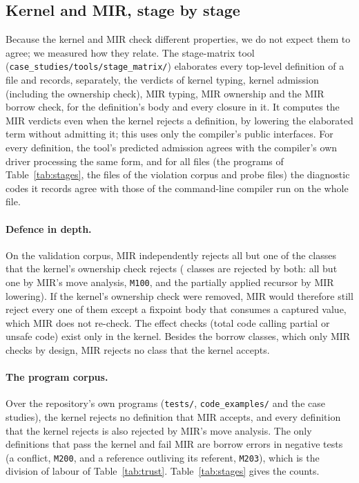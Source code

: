 \subsection{Kernel and MIR, stage by stage}\label{sec:eval:stages}

Because the kernel and MIR check different properties, we do not expect them to agree; we measured how they relate.
The stage-matrix tool (\texttt{case\_studies/tools/stage\_matrix/}) elaborates every top-level definition of a file and records, separately, the verdicts of kernel typing, kernel admission (including the ownership check), MIR typing, MIR ownership and the MIR borrow check, for the definition's body and every closure in it.
It computes the MIR verdicts even when the kernel rejects a definition, by lowering the elaborated term without admitting it; this uses only the compiler's public interfaces.
For every definition, the tool's predicted admission agrees with the compiler's own driver processing the same form, and for all \NumStageCliFiles{} files (the programs of Table~\ref{tab:stages}, the files of the violation corpus and \NumStageProbeFiles{} probe files) the diagnostic codes it records agree with those of the command-line compiler run on the whole file.

\paragraph{Defence in depth.}
On the validation corpus, MIR independently rejects all but one of the classes that the kernel's ownership check rejects (\NumStageCorpusBoth{} classes are rejected by both: all but one by MIR's move analysis, \texttt{M100}, and the partially applied recursor by MIR lowering).
If the kernel's ownership check were removed, MIR would therefore still reject every one of them except a fixpoint body that consumes a captured value, which MIR does not re-check.
The effect checks (total code calling partial or unsafe code) exist only in the kernel.
Besides the borrow classes, which only MIR checks by design, MIR rejects no class that the kernel accepts.

\paragraph{The program corpus.}
Over the repository's own programs (\texttt{tests/}, \texttt{code\_examples/} and the case studies), the kernel rejects no definition that MIR accepts, and every definition that the kernel rejects is also rejected by MIR's move analysis.
The only definitions that pass the kernel and fail MIR are \NumStageKAcceptMReject{} borrow errors in negative tests (a conflict, \texttt{M200}, and a reference outliving its referent, \texttt{M203}), which is the division of labour of Table~\ref{tab:trust}.
Table~\ref{tab:stages} gives the counts.

